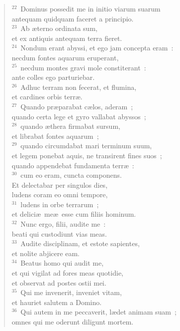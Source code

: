 \begin{flushleft}\begin{verse}${}^{22}$~Dominus possedit me in initio viarum suarum\\ antequam quidquam faceret a principio.\\
${}^{23}$~Ab \ae terno ordinata sum,\\ et ex antiquis antequam terra fieret.\\
${}^{24}$~Nondum erant abyssi, et ego jam concepta eram~:\\ necdum fontes aquarum eruperant,\\
${}^{25}$~necdum montes gravi mole constiterant~:\\ ante colles ego parturiebar.\\
${}^{26}$~Adhuc terram non fecerat, et flumina,\\ et cardines orbis terr\ae .\\
${}^{27}$~Quando pr\ae parabat c\ae los, aderam~;\\ quando certa lege et gyro vallabat abyssos~;\\
${}^{28}$~quando \ae thera firmabat sursum,\\ et librabat fontes aquarum~;\\
${}^{29}$~quando circumdabat mari terminum suum,\\ et legem ponebat aquis, ne transirent fines suos~;\\ quando appendebat fundamenta terr\ae~:\\
${}^{30}$~cum eo eram, cuncta componens.\\ Et delectabar per singulos dies,\\ ludens coram eo omni tempore,\\
${}^{31}$~ludens in orbe terrarum~;\\ et delici\ae\ me\ae\ esse cum filiis hominum.\\
${}^{32}$~Nunc ergo, filii, audite me~:\\ beati qui custodiunt vias meas.\\
${}^{33}$~Audite disciplinam, et estote sapientes,\\ et nolite abjicere eam.\\
${}^{34}$~Beatus homo qui audit me,\\ et qui vigilat ad fores meas quotidie,\\ et observat ad postes ostii mei.\\
${}^{35}$~Qui me invenerit, inveniet vitam,\\ et hauriet salutem a Domino.\\
${}^{36}$~Qui autem in me peccaverit, l\ae det animam suam~;\\ omnes qui me oderunt diligunt mortem.\end{verse}\end{flushleft}


